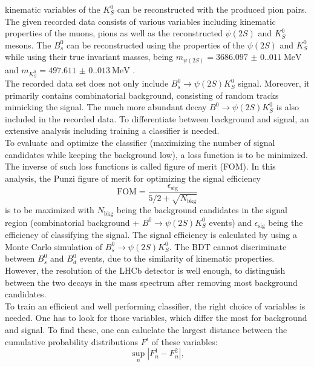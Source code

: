 kinematic variables of the $K_S^0$ can be reconstructed with the produced pion pairs.\\
The given recorded data consists of various variables including kinematic properties of the muons, pions as well as the reconstructed $\psi (2S)$ and $K_S^0$ mesons. The $B_s^0$ can be reconstructed using the
properties of the $\psi (2S)$ and $K_S^0$ while using their true invariant masses, being $m_{\psi (2S)} = \qty{3686.097(0.011)}{\mega\electronvolt}$ and $m_{K_S^0} = \qty{497.611(0.013)}{\mega\electronvolt}$ \cite{PDG}.\\
The recorded data set does not only include $B_s^0 \to \psi (2S)K_S^0$ signal. Moreover, it primarily contains combinatorial background, consisting of random tracks mimicking the signal. 
The much more abundant decay $B^0 \to \psi (2S)K_S^0$ is also included in the recorded data. To differentiate between background and signal, an extensive analysis including
training a classifier is needed.\\
To evaluate and optimize the classifier (maximizing the number of signal candidates while keeping the background low), a loss function is to be minimized. The inverse of such loss functions is called figure of merit (FOM).
In this analysis, the Punzi figure of merit for optimizing the signal efficiency
\begin{equation}
    \label{eq:FOM}
    \mathrm{FOM}  = \frac{\epsilon_{\mathrm{sig}}}{5/2 + \sqrt{N_{\mathrm{bkg}}}}
\end{equation}
is to be maximized with $N_{\mathrm{bkg}}$ being the background candidates in the signal region (combinatorial background + $B^0 \to \psi (2S)K_S^0$ events) and $\epsilon_{\mathrm{sig}}$ being the efficiency of classifying
the signal. The signal efficiency is calculated by using a Monte Carlo simulation of $B_s^0 \to \psi (2S)K_S^0$. The BDT cannot discriminate between $B_s^0$ and $B_d^0$ events, due to the similarity of kinematic
properties. However, the resolution of the LHCb detector is well enough, to distinguish between the two decays in the mass spectrum after removing most background candidates.\\
To train an efficient and well performing classifier, the right choice of variables is needed. One has to look for those variables, which differ the most for background and signal. To find these, one can caluclate the 
largest distance between the cumulative probability distributions $F^i$ of these variables:
\begin{equation}
    \label{eq:Kolmogorov}
    \sup\limits_{n} | F_n^1 - F_n^2 |,
\end{equation}

